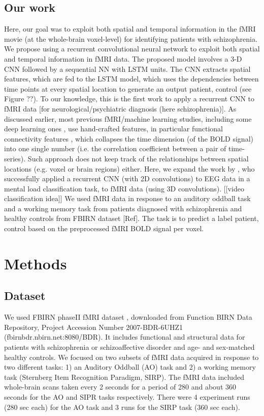 \documentclass{article}
\begin{document}
\subsection{Our work}
Here, our goal was to exploit both spatial and temporal information in the fMRI movie (at the whole-brain voxel-level) for identifying patients with schizophrenia. We propose using a recurrent convolutional neural network to exploit both spatial and temporal information in fMRI data. The proposed model involves a 3-D CNN followed by a sequential NN with LSTM units. The CNN extracts spatial features, which are fed to the LSTM model, which uses the dependencies between time points at every spatial location to generate an output {patient, control} (see Figure ??). To our knowledge, this is the first work to apply a recurrent CNN to fMRI data [for neurological/psychiatric diagnosis (here schizophrenia)]. As discussed earlier, most previous fMRI/machine learning studies, including some deep learning ones \citep{Kim2016}, use hand-crafted features, in particular functional connectivity features \citep{Gheiratmand2017}, which collapses the time dimension (of the BOLD signal) into one single number (i.e. the correlation coefficient between a pair of time-series). Such approach does not keep track of the relationships between spatial locations (e.g. voxel or brain regions) either. Here, we expand the work by \citet{Bashivan2016}, who successfully applied a recurrent CNN (with 2D convolutions) to EEG data in a mental load classification task, to fMRI data (using 3D convolutions). [[video classification idea]] We used fMRI data in response to an auditory oddball task and a working memory task from patients diagnosed with schizophrenia and healthy controls from FBIRN dataset [Ref]. The task is to predict a label {patient, control} based on the preprocessed fMRI BOLD signal per voxel.
\section{Methods}

\subsection{Dataset}
We used FBIRN phaseII fMRI dataset \citep{Keator2016}, downloaded from Function BIRN Data Repository, Project Accession Number 2007-BDR-6UHZ1 (fbirnbdr.nbirn.net:8080/BDR). It includes functional and structural data for patients with schizophrenia or schizoaffective disorder and age- and sex-matched healthy controls. We focused on two subsets of fMRI data acquired in response to two different tasks: 1) an Auditory Oddball (AO) task and 2) a working memory task (Sternberg Item Recognition Paradigm, SIRP). The fMRI data included whole-brain scans taken every 2 seconds for a period of 280 and about 360 seconds for the AO and SIPR tasks respectively. There were 4 experiment runs (280 sec each) for the AO task and 3 runs for the SIRP task (360 sec each).
\end{document}
